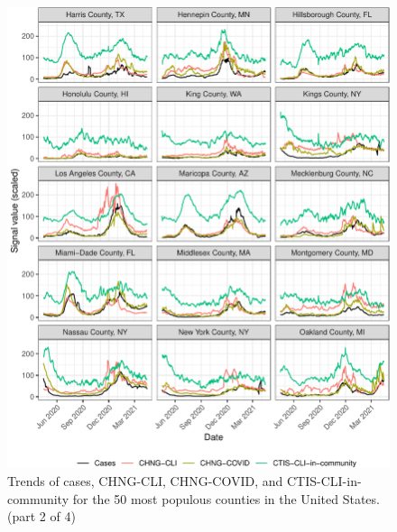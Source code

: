 \begin{figure}

{\centering \includegraphics[width=\textwidth]{fig/county-trend-grids-2-1}

}

\caption{Trends of cases, CHNG-CLI, CHNG-COVID, and CTIS-CLI-in-community for the 50 most populous counties in the United States. (part 2 of 4)}\label{fig:county-trend-grids-2}
\end{figure}

\clearpage

